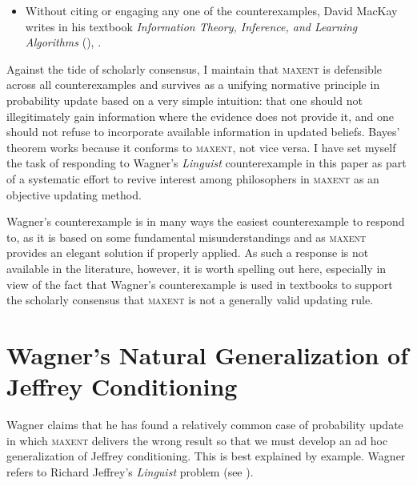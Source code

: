 \documentclass[11pt]{article}
\begin{document}
\begin{itemize}
\item Without citing or engaging any one of the counterexamples, David
  MacKay writes in his textbook \emph{Information Theory, Inference,
    and Learning Algorithms} (), 
  .
\end{itemize}

Against the tide of scholarly consensus, I maintain that
\textsc{maxent} is defensible across all counterexamples and survives
as a unifying normative principle in probability update based on a
very simple intuition: that one should not illegitimately gain
information where the evidence does not provide it, and one should not
refuse to incorporate available information in updated beliefs. Bayes'
theorem works because it conforms to \textsc{maxent}, not vice versa.
I have set myself the task of responding to Wagner's \emph{Linguist}
counterexample in this paper as part of a systematic effort to revive
interest among philosophers in \textsc{maxent} as an objective
updating method.

Wagner's counterexample is in many ways the easiest counterexample to
respond to, as it is based on some fundamental misunderstandings and
as \textsc{maxent} provides an elegant solution if
properly applied. As such a response is not available in the
literature, however, it is worth spelling out here, especially in view
of the fact that Wagner's counterexample is used in textbooks to
support the scholarly consensus that \textsc{maxent}
is not a generally valid updating rule.

\section{Wagner's Natural Generalization of Jeffrey Conditioning}
\label{NatGen}

Wagner claims that he has found a relatively common case of
probability update in which \textsc{maxent} delivers the wrong result
so that we must develop an ad hoc generalization of Jeffrey
conditioning. This is best explained by example. Wagner refers to
Richard Jeffrey's \emph{Linguist} problem (see
).
\end{document}
